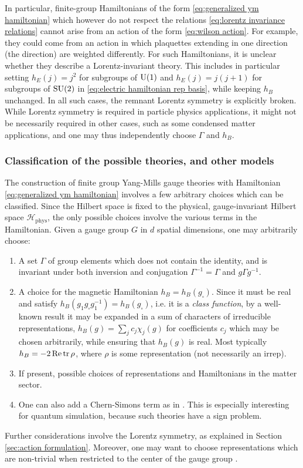 In particular, finite-group Hamiltonians of the form \eqref{eq:generalized ym hamiltonian} which however do not respect the relations \eqref{eq:lorentz invariance relations} cannot arise from an action of the form \eqref{eq:wilson action}. For example, they could come from an action in which plaquettes extending in one direction (the  direction) are weighted differently. For such Hamiltonians, it is unclear whether they describe a Lorentz-invariant theory. This includes in particular setting $h_E(j)=j^2$ for subgroups of $\mathrm{U}(1)$ and $h_E(j)=j(j+1)$ for subgroups of $\text{SU}(2)$ in \eqref{eq:electric hamiltonian rep basis}, while keeping $h_B$ unchanged. In all such cases, the remnant Lorentz symmetry is explicitly broken. While Lorentz symmetry is required in particle physics applications, it might not be necessarily required in other cases, such as some condensed matter applications, and one may thus independently choose $\Gamma$ and $h_B$.

\subsubsection{Classification of the possible theories, and other models}\label{sec:classification}

The construction of finite group Yang-Mills gauge theories with Hamiltonian \eqref{eq:generalized ym hamiltonian} involves a few arbitrary choices which can be classified.
Since the Hilbert space is fixed to the physical, gauge-invariant Hilbert space $\mathcal{H}_{\mathrm{phys}}$, the only possible choices involve the various terms in the Hamiltonian.
Given a gauge group $G$ in $d$ spatial dimensions, one may arbitrarily choose:
\begin{enumerate}
    \item A set $\Gamma$ of group elements which does not contain the identity, and is invariant under both inversion and conjugation $\Gamma^{-1}=\Gamma$ and $g \Gamma g^{-1}$.
    \item A choice for the magnetic Hamiltonian $h_B = h_B(g_\square)$.
Since it must be real and satisfy $h_B(g_1 g_\square g_1^{-1})= h_B(g_\square)$, i.e.
it is a \textit{class function}, by a well-known result \cite{serre1967representations} it may be expanded in a sum of characters of irreducible representations, $h_B(g) = \sum_j c_j \chi_j(g)$ for coefficients $c_j$ which may be chosen arbitrarily, while ensuring that $h_B(g)$ is real. Most typically $h_B = -2 \Re\tr\rho$, where $\rho$ is some representation (not necessarily an irrep).
    \item If present, possible choices of representations and Hamiltonians in the matter sector.

    \item One can also add a Chern-Simons term as in \cite{caspar2016doubledlattice}.
This is especially interesting for quantum simulation, because such theories have a sign problem.
\end{enumerate}
Further considerations involve the Lorentz symmetry, as explained in Section \ref{sec:action formulation}.
Moreover, one may want to choose representations which are non-trivial when restricted to the center of the gauge group \cite{holland2001center, cohen2014center}.


